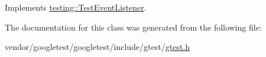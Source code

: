 Implements \hyperlink{classtesting_1_1_test_event_listener_ab4f6a0ca16ae75daf385b3b5914e1048}{testing\+::\+Test\+Event\+Listener}.



The documentation for this class was generated from the following file\+:\begin{DoxyCompactItemize}
\item 
vendor/googletest/googletest/include/gtest/\hyperlink{gtest_8h}{gtest.\+h}\end{DoxyCompactItemize}

